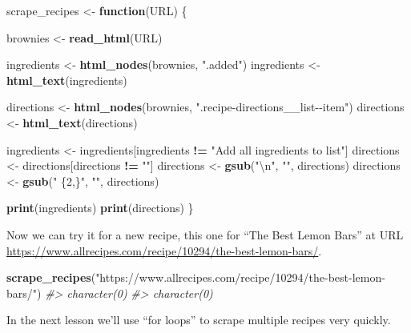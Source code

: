 \documentclass[
  12pt,
]{book}
\newenvironment{Shaded}{\begin{snugshade}}{\end{snugshade}}
\newcommand{\CharTok}[1]{\textcolor[rgb]{0.5,0.5,0.5}{#1}}
\newcommand{\CommentTok}[1]{\textcolor[rgb]{0.37,0.37,0.37}{\textit{#1}}}
\newcommand{\ControlFlowTok}[1]{\textcolor[rgb]{0.27,0.27,0.27}{\textbf{#1}}}
\newcommand{\KeywordTok}[1]{\textcolor[rgb]{0.27,0.27,0.27}{\textbf{#1}}}
\newcommand{\NormalTok}[1]{#1}
\newcommand{\OperatorTok}[1]{\textcolor[rgb]{0.43,0.43,0.43}{\textbf{#1}}}
\newcommand{\StringTok}[1]{\textcolor[rgb]{0.5,0.5,0.5}{#1}}
\begin{document}
\begin{Shaded}
\begin{Highlighting}[]
\NormalTok{scrape\_recipes <{-}}\StringTok{ }\ControlFlowTok{function}\NormalTok{(URL) \{}
  
\NormalTok{  brownies <{-}}\StringTok{ }\KeywordTok{read\_html}\NormalTok{(URL)}
  
\NormalTok{  ingredients <{-}}\StringTok{ }\KeywordTok{html\_nodes}\NormalTok{(brownies, }\StringTok{".added"}\NormalTok{)}
\NormalTok{  ingredients <{-}}\StringTok{ }\KeywordTok{html\_text}\NormalTok{(ingredients)}
  
\NormalTok{  directions <{-}}\StringTok{ }\KeywordTok{html\_nodes}\NormalTok{(brownies, }\StringTok{".recipe{-}directions\_\_list{-}{-}item"}\NormalTok{)}
\NormalTok{  directions <{-}}\StringTok{ }\KeywordTok{html\_text}\NormalTok{(directions)}
  
\NormalTok{  ingredients <{-}}\StringTok{ }\NormalTok{ingredients[ingredients }\OperatorTok{!=}\StringTok{ "Add all ingredients to list"}\NormalTok{]}
\NormalTok{  directions  <{-}}\StringTok{ }\NormalTok{directions[directions }\OperatorTok{!=}\StringTok{ ""}\NormalTok{]}
\NormalTok{  directions  <{-}}\StringTok{ }\KeywordTok{gsub}\NormalTok{(}\StringTok{"}\CharTok{\textbackslash{}n}\StringTok{"}\NormalTok{, }\StringTok{""}\NormalTok{, directions)}
\NormalTok{  directions  <{-}}\StringTok{ }\KeywordTok{gsub}\NormalTok{(}\StringTok{" \{2,\}"}\NormalTok{, }\StringTok{""}\NormalTok{, directions)}
  
  \KeywordTok{print}\NormalTok{(ingredients)}
  \KeywordTok{print}\NormalTok{(directions)}
\NormalTok{\}}
\end{Highlighting}
\end{Shaded}

Now we can try it for a new recipe, this one for ``The Best Lemon Bars'' at URL \url{https://www.allrecipes.com/recipe/10294/the-best-lemon-bars/}.

\begin{Shaded}
\begin{Highlighting}[]
\KeywordTok{scrape\_recipes}\NormalTok{(}\StringTok{"https://www.allrecipes.com/recipe/10294/the{-}best{-}lemon{-}bars/"}\NormalTok{)}
\CommentTok{\#> character(0)}
\CommentTok{\#> character(0)}
\end{Highlighting}
\end{Shaded}

In the next lesson we'll use ``for loops'' to scrape multiple recipes very quickly.
\end{document}
